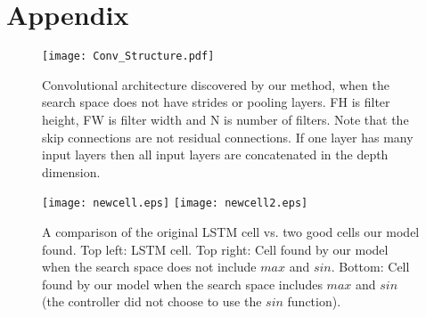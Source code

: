 \documentclass{article} \usepackage{iclr2017_conference,times}
\begin{document}



\newpage
\appendix
\section{Appendix}
\label{sec:appendix}

\begin{figure}[h!]
\begin{center}
\centerline{\texttt{[image: Conv\_Structure.pdf]}}
\caption{Convolutional architecture discovered by our method, when the
  search space does not have strides or pooling layers. FH is filter
  height, FW is filter width and N is number of filters. Note that the
  skip connections are not residual connections. If one layer has many
  input layers then all input layers are concatenated in the depth
  dimension.}
\label{figure:strange_net}
\end{center}
\end{figure} 


\begin{figure}
\begin{center}
  \texttt{[image: newcell.eps]}
  \texttt{[image: newcell2.eps]}
\caption{A comparison of the original LSTM cell vs. two good cells our
  model found. Top left: LSTM cell. Top right: Cell found by our model
  when the search space does not include $max$ and $sin$. Bottom: Cell
  found by our model when the search space includes $max$ and $sin$
  (the controller did not choose to use the $sin$ function).}
\label{fig:strange_cell}
\end{center}
\end{figure}
\end{document}
